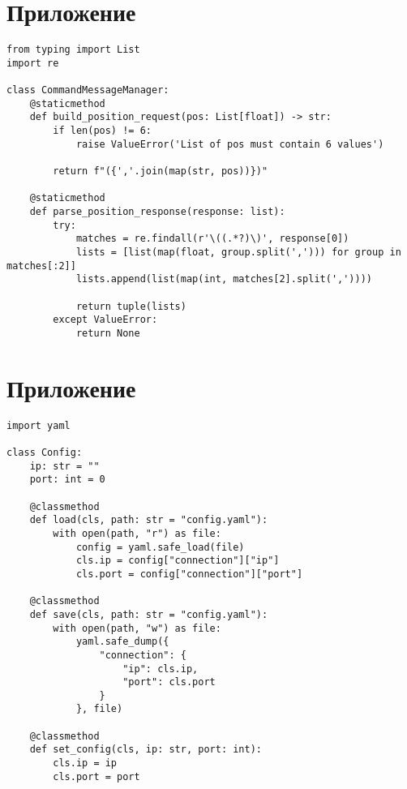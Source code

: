 \documentclass[a4paper,14pt]{extarticle}
\begin{document}
\section{Приложение}
\begin{lstlisting}[label=lst:cmdman, caption={Скрипт с функциями для обработки координат на отправку или получение.}]
from typing import List
import re

class CommandMessageManager:
    @staticmethod
    def build_position_request(pos: List[float]) -> str:
        if len(pos) != 6:
            raise ValueError('List of pos must contain 6 values')

        return f"({','.join(map(str, pos))})"

    @staticmethod
    def parse_position_response(response: list):
        try:
            matches = re.findall(r'\((.*?)\)', response[0])
            lists = [list(map(float, group.split(','))) for group in matches[:2]]
            lists.append(list(map(int, matches[2].split(','))))

            return tuple(lists)
        except ValueError:
            return None
\end{lstlisting}


\section{Приложение}
\begin{lstlisting}[label=lst:cfg, caption={Скрипт для работы с чтением и сохранением конфигурации IP и порта робота.}]
import yaml

class Config:
    ip: str = ""
    port: int = 0

    @classmethod
    def load(cls, path: str = "config.yaml"):
        with open(path, "r") as file:
            config = yaml.safe_load(file)
            cls.ip = config["connection"]["ip"]
            cls.port = config["connection"]["port"]

    @classmethod
    def save(cls, path: str = "config.yaml"):
        with open(path, "w") as file:
            yaml.safe_dump({
                "connection": {
                    "ip": cls.ip,
                    "port": cls.port
                }
            }, file)

    @classmethod
    def set_config(cls, ip: str, port: int):
        cls.ip = ip
        cls.port = port
\end{lstlisting}
\end{document}
